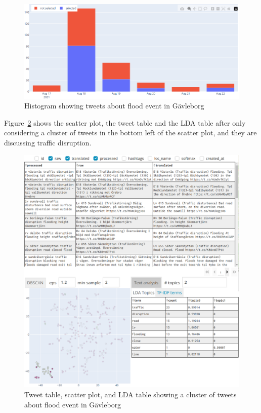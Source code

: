 \begin{figure}[H]
  \begin{center}
    \includegraphics[width=\columnwidth]{./images/gavle_histogram.png}
  \end{center}
  \caption{Histogram showing tweets about flood event in Gävleborg}
  \label{fig:gavle_histogram}
\end{figure}


Figure~\ref{fig:gavle_text_analysis} shows the scatter plot, the tweet table and the \ac{LDA} table after only considering a
cluster of tweets in the bottom left of the scatter plot, and they are discussing traffic
disruption.

\begin{figure}[H]
  \begin{center}
    \includegraphics[width=\columnwidth]{./images/gavle_text_analysis.png}
  \end{center}
  \caption{Tweet table, scatter plot, and \ac{LDA} table showing a cluster of tweets about flood event in Gävleborg}
  \label{fig:gavle_text_analysis}
\end{figure}


